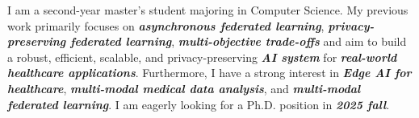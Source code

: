 

\begin{cvparagraph}


I am a second-year master's student majoring in Computer Science.
My previous work primarily focuses on \textit{\textbf{asynchronous federated learning}}, \textit{\textbf{privacy-preserving federated learning}}, \textit{\textbf{multi-objective trade-offs}}
and aim to build a robust, efficient, scalable, and privacy-preserving \textit{\textbf{AI system}} for \textit{\textbf{real-world healthcare applications}}.
Furthermore, I have a strong interest in \textit{\textbf{Edge AI for healthcare}}, \textit{\textbf{multi-modal medical data analysis}}, and \textit{\textbf{multi-modal federated learning}}.
I am eagerly looking for a Ph.D. position in \textit{\textbf{2025 fall}}.


\end{cvparagraph}
